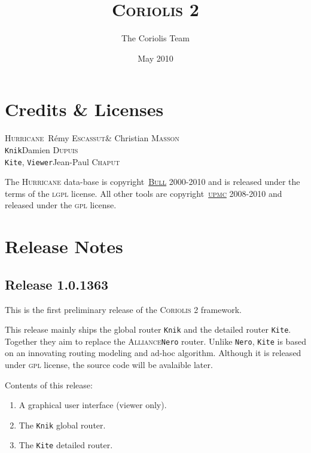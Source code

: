 \documentclass[11pt]{article}
\newcommand {\Chaput}             {\textsc{Chaput}\xspace}
\newcommand {\Dupuis}             {\textsc{Dupuis}\xspace}
\newcommand {\Escassut}           {\textsc{Escassut}\xspace}
\newcommand {\Masson}             {\textsc{Masson}\xspace}
\newcommand {\LGPL}               {\textsc{lgpl}\xspace}
\newcommand {\GPL}                {\textsc{gpl}\xspace}
\newcommand {\Bull}               {\href{http://www.bull.com/}{\textsc{Bull}}\xspace}
\newcommand {\UPMC}               {\href{http://www.upmc.fr/}{\textsc{upmc}}\xspace}
\newcommand {\Alliance}           {\textsc{Alliance}\xspace}
\newcommand {\Nero}               {\texttt{Nero}\xspace}
\newcommand {\CoriolisII}         {\textsc{Coriolis 2}\xspace}
\newcommand {\Hurricane}          {\textsc{Hurricane}\xspace}
\newcommand {\Knik}               {\texttt{Knik}\xspace}
\newcommand {\Kite}               {\texttt{Kite}\xspace}
\newcommand {\Viewer}             {\texttt{Viewer}\xspace}
\begin{document}
 \title{\CoriolisII}
 \author{The Coriolis Team}
 \date{May 2010}

 \maketitle

 \thispagestyle{fancy}

 \tableofcontents

 \section{Credits \& Licenses}

 \begin{center}
   \Hurricane     \dotfill\      Rémy \Escassut \& Christian \Masson   \\
   \Knik          \dotfill     Damien \Dupuis   \\
   \Kite, \Viewer \dotfill  Jean-Paul \Chaput   \\
 \end{center}

 The \Hurricane data-base is copyright\textcopyright\ \Bull 2000-2010 and is
 released under the terms of the \LGPL license. All other tools are
 copyright\textcopyright\ \UPMC 2008-2010 and released under the \GPL
 license. 

 \newpage


 \section{Release Notes}

 \subsection{Release 1.0.1363}

 This is the first preliminary release of the \CoriolisII framework.

 This release mainly ships the global router \Knik and the detailed router
 \Kite. Together they aim to replace the \Alliance \Nero router.
 Unlike \Nero, \Kite is based on an innovating routing modeling and ad-hoc
 algorithm. Although it is released under \GPL license, the source code
 will be avalaible later.
 \medskip

 \noindent Contents of this release:
 \begin{enumerate}
   \item A graphical user interface (viewer only).
   \item The \Knik global router.
   \item The \Kite detailed router.
 \end{enumerate}
\end{document}
